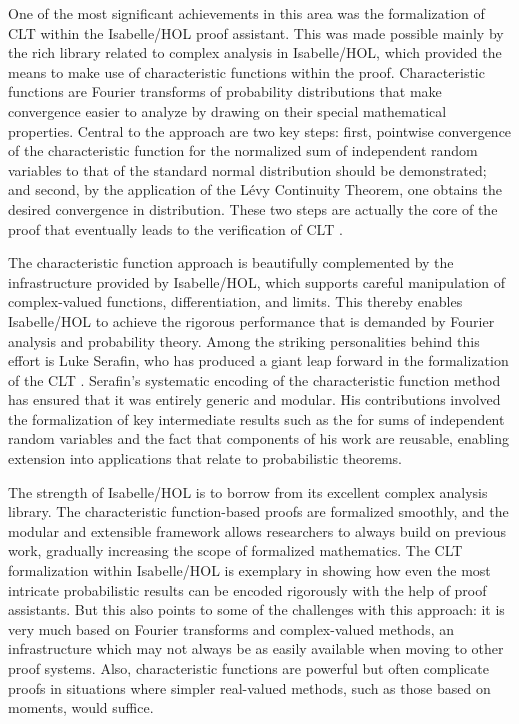 One of the most significant achievements in this area was the formalization of CLT within the Isabelle/HOL proof assistant. This was made possible mainly by the rich library related to complex analysis in Isabelle/HOL, which provided the means to make use of characteristic functions within the proof. Characteristic functions are Fourier transforms of probability distributions that make convergence easier to analyze by drawing on their special mathematical properties. Central to the approach are two key steps: first, pointwise convergence of the characteristic function for the normalized sum of independent random variables to that of the standard normal distribution should be demonstrated; and second, by the application of the Lévy Continuity Theorem, one obtains the desired convergence in distribution. These two steps are actually the core of the proof that eventually leads to the verification of CLT \cite{billingsley2017probability}.

The characteristic function approach is beautifully complemented by the infrastructure provided by Isabelle/HOL, which supports careful manipulation of complex-valued functions, differentiation, and limits. This thereby enables Isabelle/HOL to achieve the rigorous performance that is demanded by Fourier analysis and probability theory. Among the striking personalities behind this effort is Luke Serafin, who has produced a giant leap forward in the formalization of the CLT \cite{serafin2015formally}. Serafin's systematic encoding of the characteristic function method has ensured that it was entirely generic and modular. His contributions involved the formalization of key intermediate results such as the for sums of independent random variables and the fact that components of his work are reusable, enabling extension into applications that relate to probabilistic theorems.

The strength of Isabelle/HOL is to borrow from its excellent complex analysis library. The characteristic function-based proofs are formalized smoothly, and the modular and extensible framework allows researchers to always build on previous work, gradually increasing the scope of formalized mathematics. The CLT formalization within Isabelle/HOL is exemplary in showing how even the most intricate probabilistic results can be encoded rigorously with the help of proof assistants. But this also points to some of the challenges with this approach: it is very much based on Fourier transforms and complex-valued methods, an infrastructure which may not always be as easily available when moving to other proof systems. Also, characteristic functions are powerful but often complicate proofs in situations where simpler real-valued methods, such as those based on moments, would suffice.

